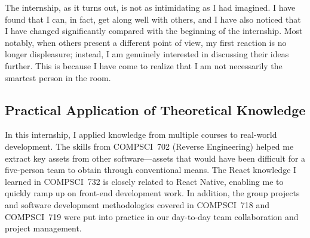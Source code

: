 \documentclass[sigconf]{acmart}
\begin{document}
The internship, as it turns out, is not as intimidating as I had imagined. I have found that I can, in fact, get along well with others, and I have also noticed that I have changed significantly compared with the beginning of the internship. Most notably, when others present a different point of view, my first reaction is no longer displeasure; instead, I am genuinely interested in discussing their ideas further. This is because I have come to realize that I am not necessarily the smartest person in the room.

\subsection{Practical Application of Theoretical Knowledge}

In this internship, I applied knowledge from multiple courses to real-world development. The skills from COMPSCI~702 (Reverse Engineering) helped me extract key assets from other software---assets that would have been difficult for a five-person team to obtain through conventional means. The React knowledge I learned in COMPSCI~732 is closely related to React Native, enabling me to quickly ramp up on front-end development work. In addition, the group projects and software development methodologies covered in COMPSCI~718 and COMPSCI~719 were put into practice in our day-to-day team collaboration and project management.




\end{document}
